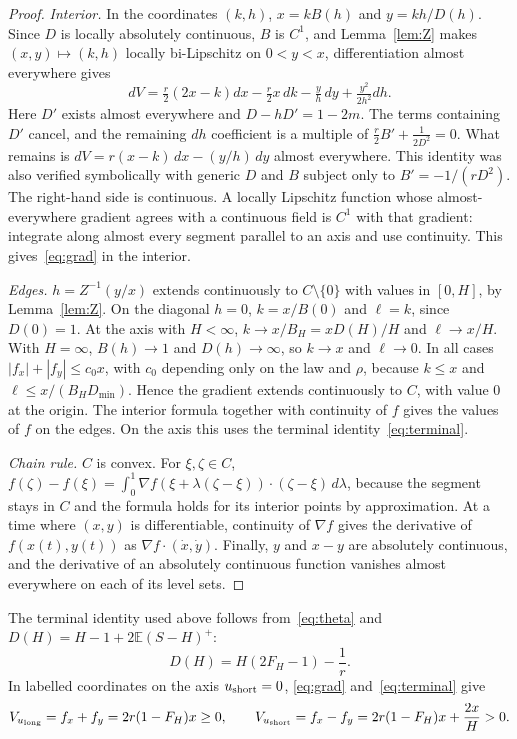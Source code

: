\documentclass[11pt]{article}
\numberwithin{equation}{section}
\theoremstyle{definition}
\theoremstyle{remark}
\newcommand{\E}{\mathbb{E}}
\begin{document}
\begin{proof}
\emph{Interior.} In the coordinates $(k,h)$, $x=kB(h)$ and $y=kh/D(h)$. Since $D$ is locally absolutely continuous, $B$ is $C^1$, and Lemma~\ref{lem:Z} makes $(x,y)\mapsto(k,h)$ locally bi-Lipschitz on $0<y<x$, differentiation almost everywhere gives
\[
dV=\tfrac r2(2x-k)dx-\tfrac r2x\,dk-\tfrac yh\,dy+\tfrac{y^2}{2h^2}dh .
\]
Here $D'$ exists almost everywhere and $D-hD'=1-2m$. The terms containing $D'$ cancel, and the remaining $dh$ coefficient is a multiple of $\tfrac r2B'+\tfrac1{2D^2}=0$. What remains is $dV=r(x-k)\,dx-(y/h)\,dy$ almost everywhere. This identity was also verified symbolically with generic $D$ and $B$ subject only to $B'=-1/(rD^2)$. The right-hand side is continuous. A locally Lipschitz function whose almost-everywhere gradient agrees with a continuous field is $C^1$ with that gradient: integrate along almost every segment parallel to an axis and use continuity. This gives~\eqref{eq:grad} in the interior.

\emph{Edges.} $h=Z^{-1}(y/x)$ extends continuously to $C\setminus\{0\}$ with values in $[0,H]$, by Lemma~\ref{lem:Z}. On the diagonal $h=0$, $k=x/B(0)$ and $\ell=k$, since $D(0)=1$. At the axis with $H<\infty$, $k\to x/B_H=xD(H)/H$ and $\ell\to x/H$. With $H=\infty$, $B(h)\to1$ and $D(h)\to\infty$, so $k\to x$ and $\ell\to0$. In all cases $|f_x|+|f_y|\le c_0x$, with $c_0$ depending only on the law and $\rho$, because $k\le x$ and $\ell\le x/(B_HD_{\min})$. Hence the gradient extends continuously to $C$, with value $0$ at the origin. The interior formula together with continuity of $f$ gives the values of $f$ on the edges. On the axis this uses the terminal identity~\eqref{eq:terminal}.

\emph{Chain rule.} $C$ is convex. For $\xi,\zeta\in C$, $f(\zeta)-f(\xi)=\int_0^1\nabla f(\xi+\lambda(\zeta-\xi))\cdot(\zeta-\xi)\,d\lambda$, because the segment stays in $C$ and the formula holds for its interior points by approximation. At a time where $(x,y)$ is differentiable, continuity of $\nabla f$ gives the derivative of $f(x(t),y(t))$ as $\nabla f\cdot(\dot x,\dot y)$. Finally, $y$ and $x-y$ are absolutely continuous, and the derivative of an absolutely continuous function vanishes almost everywhere on each of its level sets.
\end{proof}

The terminal identity used above follows from~\eqref{eq:theta} and $D(H)=H-1+2\E(S-H)^+$:
\begin{equation}\label{eq:terminal}
D(H)=H(2F_H-1)-\frac1r.
\end{equation}
In labelled coordinates on the axis $u_{\rm short}=0$, \eqref{eq:grad} and~\eqref{eq:terminal} give
\begin{equation}\label{eq:axisgrad}
V_{u_{\rm long}}=f_x+f_y=2r(1-F_H)x\ge0,\qquad V_{u_{\rm short}}=f_x-f_y=2r(1-F_H)x+\frac{2x}{H}>0.
\end{equation}
\end{document}
